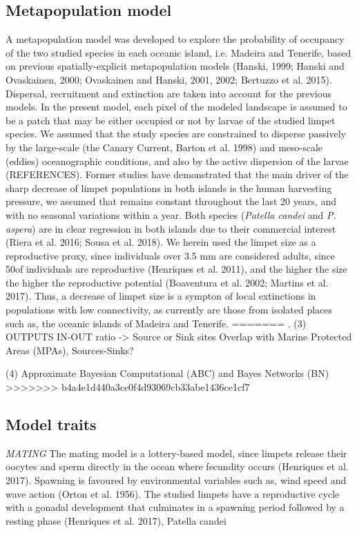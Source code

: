 \documentclass[12pt]{article}
\begin{document}
\begin{flushleft}
\subsection{Metapopulation model}
A metapopulation model was developed to explore the probability of
occupancy of the two studied species in each oceanic island,
i.e. Madeira and Tenerife, based on previous spatially-explicit
metapopulation models (Hanski, 1999; Hanski and Ovaskainen, 2000;
Ovaskainen and Hanski, 2001, 2002; Bertuzzo et al. 2015). Dispersal,
recruitment and extinction are taken into account for the previous
models. In the present model, each pixel of the modeled landscape is
assumed to be a patch that may be either occupied or not by larvae of
the studied limpet species. We assumed that the study species are
constrained to disperse passively by the large-scale (the Canary
Current, Barton et al. 1998) and meso-scale (eddies) oceanographic
conditions, and also by the active dispersion of the larvae
(REFERENCES). Former studies have demonstrated that the main driver of
the sharp decrease of limpet populations in both islands is the human
harvesting pressure, we assumed that remains constant throughout the
last 20 years, and with no seasonal variations within a year. Both
species (\textit{Patella candei} and \textit{P. aspera}) are in clear
regression in both islands due to their commercial interest (Riera et
al. 2016; Sousa et al. 2018). We herein used the limpet size as a
reproductive proxy, since individuals over 3.5 mm are considered
adults, since 50\percent of individuals are reproductive (Henriques et
al. 2011), and the higher the size the higher the reproductive
potential (Boaventura et al. 2002; Martins et al. 2017). Thus, a
decrease of limpet size is a sympton of local extinctions in
populations with low connectivity, as currently are those from
isolated places such as, the oceanic islands of Madeira and Tenerife.
=======
. 
(3) OUTPUTS
IN-OUT ratio -> Source or Sink sites
Overlap with Marine Protected Areas (MPAs), Sources-Sinks?

(4) Approximate Bayesian Computational (ABC) and Bayes Networks (BN)
>>>>>>> b4a4e1d440a3ce0f4d93069cb33abe1436ce1cf7

\subsection {Model traits}
\textit{MATING}
The mating model is a lottery-based model, since limpets release their oocytes and sperm directly in the ocean where fecundity occurs (Henriques et al. 2017). Spawning is favoured by environmental variables such as, wind speed and wave action (Orton et al. 1956). The studied limpets have a reproductive cycle with a gonadal development that culminates in a spawning period followed by a resting phase (Henriques et al. 2017), Patella candei 



\end{flushleft}
\end{document}
